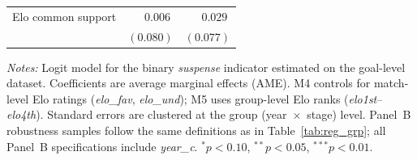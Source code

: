 \begin{table}[H]
\begin{threeparttable}
\begin{tabular}{l cc cc}
Elo common support      & \multicolumn{2}{c}{$\phantom{-}0.006$} & \multicolumn{2}{c}{$\phantom{-}0.029$} \\
                        & \multicolumn{2}{c}{$(0.080)$} & \multicolumn{2}{c}{$(0.077)$} \\
\bottomrule
\end{tabular}
\begin{tablenotes}
\small
\item \textit{Notes:} Logit model for the binary \textit{suspense} indicator estimated on the goal-level dataset. Coefficients are average marginal effects (AME). M4 controls for match-level Elo ratings (\textit{elo\_fav}, \textit{elo\_und}); M5 uses group-level Elo ranks (\textit{elo1st}--\textit{elo4th}). Standard errors are clustered at the group (year~$\times$~stage) level. Panel~B robustness samples follow the same definitions as in Table~\ref{tab:reg_grp}; all Panel~B specifications include \textit{year\_c}. $^{*}p<0.10$, $^{**}p<0.05$, $^{***}p<0.01$.
\end{tablenotes}
\end{threeparttable}
\end{table}
